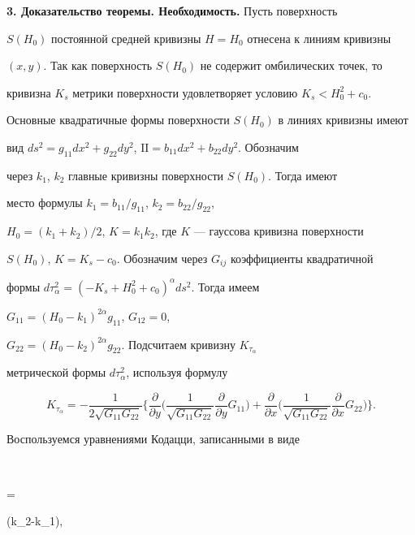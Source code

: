 \medskip 


 


{\bf 3. Доказательство теоремы. Необходимость.} Пусть поверхность 


$S(H_0)$ постоянной средней кривизны $H=H_0$ отнесена к линиям кривизны 


$(x,y)$. Так как поверхность $S(H_0)$ не содержит омбилических точек, то 


кривизна $K_s$ метрики поверхности удовлетворяет условию $K_s<H^2_0+c_0$. 


Основные квадратичные формы поверхности $S(H_0)$ в линиях кривизны имеют 


вид $ds^2=g_{11}dx^2+g_{22}dy^2$, $\mathrm{II}=b_{11}dx^2+b_{22}dy^2$. Обозначим 


через $k_1$, $k_2$ главные кривизны поверхности $S(H_0)$. Тогда имеют 


место формулы $k_1=b_{11}/g_{11}$, $k_2=b_{22}/g_{22}$, 


$H_0=(k_1+k_2)/2$, $K=k_1k_2$, где $K$ --- гауссова кривизна поверхности 


$S(H_0)$, $K=K_s-c_0$. Обозначим через $G_{ij}$ коэффициенты квадратичной 


формы $d\tau^2_\alpha=(-K_s+H^2_0+c_0)^\alpha ds^2$. Тогда имеем 


$G_{11}=(H_0-k_1)^{2\alpha}g_{11}$, $G_{12}=0$, 


$G_{22}=(H_0-k_2)^{2\alpha}g_{22}$. Подсчитаем кривизну $K_{\tau_\alpha}$ 


метрической формы $d\tau^2_\alpha$, используя формулу 


$$ 


K_{\tau_\alpha}=-\frac{1}{2\sqrt{G_{11}G_{22}}}\bigg\{ 


\frac{\partial}{\partial y}\bigg(\frac{1}{\sqrt{G_{11}G_{22}}} 


\frac{\partial}{\partial y}G_{11}\bigg)+ 


\frac{\partial}{\partial x}\bigg( 


\frac{1}{\sqrt{G_{11}G_{22}}}\frac{\partial}{\partial x} 


G_{22}\bigg)\bigg\}. 


$$ 


Воспользуемся уравнениями Кодацци, записанными в виде 


$$ 


= 


(k_2-k_1),\quad 


